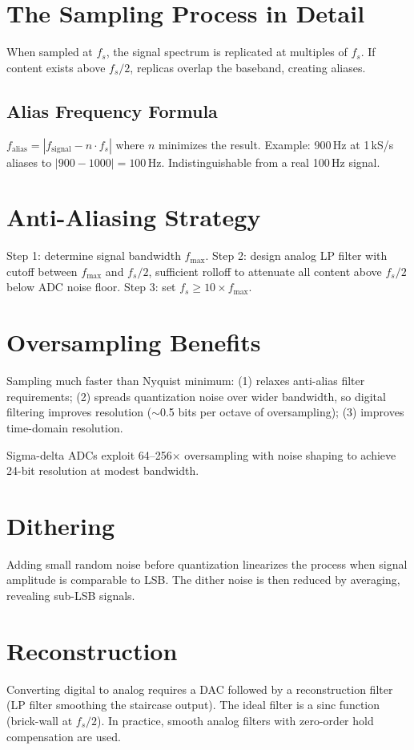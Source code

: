 \documentclass[11pt,letterpaper,twoside,openany]{book}
\begin{document}
\section{The Sampling Process in Detail}
When sampled at $f_s$, the signal spectrum is replicated at multiples of $f_s$. If content exists above $f_s/2$, replicas overlap the baseband, creating aliases.

\subsection{Alias Frequency Formula}
$f_{\text{alias}} = |f_{\text{signal}} - n \cdot f_s|$ where $n$ minimizes the result. Example: 900\,Hz at 1\,kS/s aliases to $|900-1000| = 100$\,Hz. Indistinguishable from a real 100\,Hz signal.

\section{Anti-Aliasing Strategy}
Step 1: determine signal bandwidth $f_{\max}$. Step 2: design analog LP filter with cutoff between $f_{\max}$ and $f_s/2$, sufficient rolloff to attenuate all content above $f_s/2$ below ADC noise floor. Step 3: set $f_s \geq 10 \times f_{\max}$.

\section{Oversampling Benefits}
Sampling much faster than Nyquist minimum: (1) relaxes anti-alias filter requirements; (2) spreads quantization noise over wider bandwidth, so digital filtering improves resolution ($\sim$0.5 bits per octave of oversampling); (3) improves time-domain resolution.

Sigma-delta ADCs exploit 64--256$\times$ oversampling with noise shaping to achieve 24-bit resolution at modest bandwidth.

\section{Dithering}
Adding small random noise before quantization linearizes the process when signal amplitude is comparable to LSB. The dither noise is then reduced by averaging, revealing sub-LSB signals.

\section{Reconstruction}
Converting digital to analog requires a DAC followed by a reconstruction filter (LP filter smoothing the staircase output). The ideal filter is a sinc function (brick-wall at $f_s/2$). In practice, smooth analog filters with zero-order hold compensation are used.
\end{document}

